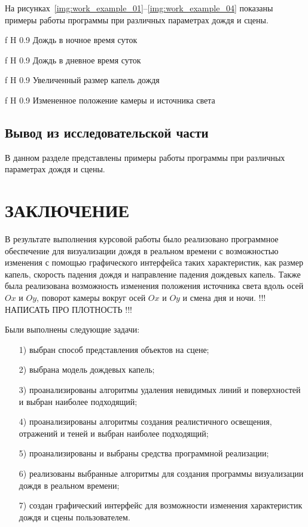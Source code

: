 На рисунках~\ref{img:work_example_01}--\ref{img:work_example_04} показаны примеры работы программы при различных параметрах дождя и сцены.

    {f}
    {H}
    {0.9\textwidth}
    {Дождь в ночное время суток}
    
    {f}
    {H}
    {0.9\textwidth}
    {Дождь в дневное время суток}
    
    {f}
    {H}
    {0.9\textwidth}
    {Увеличенный размер капель дождя}
    
    {f}
    {H}
    {0.9\textwidth}
    {Измененное положение камеры и источника света}

\section*{Вывод из исследовательской части}

В данном разделе представлены примеры работы программы при различных параметрах дождя и сцены. 

{\centering \chapter*{ЗАКЛЮЧЕНИЕ}}

В результате выполнения курсовой работы было реализовано программное обеспечение для визуализации дождя в реальном времени с возможностью изменения с помощью графического интерфейса таких характеристик, как размер капель, скорость падения дождя и направление падения дождевых капель. 
Также была реализована возможность изменения положения источника света вдоль осей $Ox$ и $Oy$, поворот камеры вокруг осей $Ox$ и $Oy$ и смена дня и ночи. 
!!! НАПИСАТЬ ПРО ПЛОТНОСТЬ !!!

Были выполнены следующие задачи:
\begin{enumerate}
\item[1)]
выбран способ представления объектов на сцене;
\item[2)]
выбрана модель дождевых капель;
\item[3)]
проанализированы алгоритмы удаления невидимых линий и поверхностей и выбран наиболее подходящий;
\item[4)]
проанализированы алгоритмы создания реалистичного освещения, отражений и теней и выбран наиболее подходящий;
\item[5)]
проанализированы и выбраны средства программной реализации;
\item[6)]
реализованы выбранные алгоритмы для создания программы визуализации дождя в реальном времени;
\item[7)]
создан графический интерфейс для возможности изменения характеристик дождя и сцены пользователем.
\end{enumerate}

{\centering \printbibliography[title=СПИСОК ИСПОЛЬЗОВАННЫХ ИСТОЧНИКОВ]}


